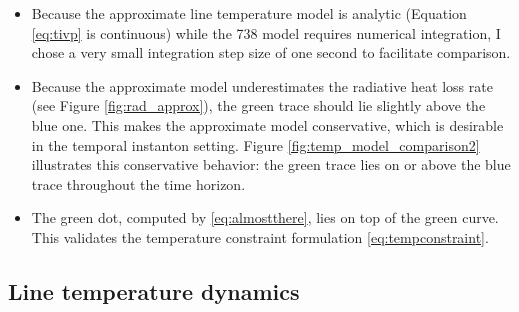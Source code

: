 \documentclass[conference]{IEEEtran}
\begin{document}
\begin{itemize}
\item
  Because the approximate line temperature model is analytic (Equation \eqref{eq:tivp} is continuous) while the 738 model requires numerical integration, I chose
  a very small integration step size of one second to facilitate comparison.
\item
  Because the approximate model underestimates the radiative heat loss
  rate (see Figure \ref{fig:rad_approx}), the green trace should lie slightly above the blue one. This
  makes the approximate model conservative, which is desirable in the
  temporal instanton setting. Figure \ref{fig:temp_model_comparison2} illustrates this conservative behavior: the green trace lies on or above the blue trace throughout the time horizon.
  \item The green dot, computed by \eqref{eq:almostthere}, lies on top of the green curve. This validates the temperature constraint formulation \eqref{eq:tempconstraint}.
\end{itemize}

\subsection{Line temperature dynamics}\label{sec:temp-dynamics}



\end{document}
